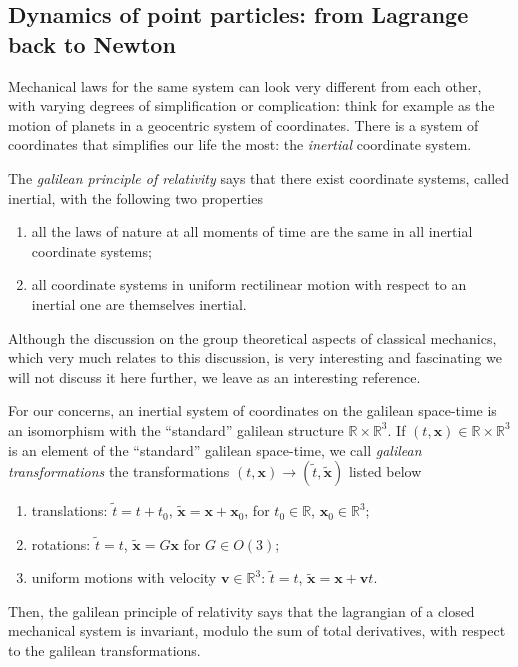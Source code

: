 \documentclass[english,fontsize=11pt,paper=a5,oneside]{scrbook}
\newcommand{\R}{\mathbb{R}}
\newcommand{\bx}{\bm{x}}
\theoremstyle{definition}
\begin{document}
\subsection{Dynamics of point particles: from Lagrange back to Newton}\label{sec:dynamicspps}

Mechanical laws for the same system can look very different from each other, with varying degrees of simplification or complication: think for example as the motion of planets in a geocentric system of coordinates.
There is a system of coordinates that simplifies our life the most: the \emph{inertial} coordinate system.

\begin{tcolorbox}
  The \emph{galilean principle of relativity} says that there exist coordinate systems, called inertial, with the following two properties
  \begin{enumerate}
    \item all the laws of nature at all moments of time are the same in all inertial coordinate systems;
    \item all coordinate systems in uniform rectilinear motion with respect to an inertial one are themselves inertial.
  \end{enumerate}
\end{tcolorbox}

Although the discussion on the group theoretical aspects of classical mechanics, which very much relates to this discussion, is very interesting and fascinating we will not discuss it here further, we leave \cite{book:marsdenratiu} as an interesting reference.

For our concerns, an inertial system of coordinates on the galilean space-time is an isomorphism with the ``standard'' galilean structure $\R\times\R^3$.
If $(t, \bx) \in \R\times \R^3$ is an element of the ``standard'' galilean space-time, we call \emph{galilean transformations} the transformations $(t,\bx) \to (\widetilde t, \widetilde{\bx})$ listed below
\begin{enumerate}
  \item translations: $\widetilde t = t + t_0$, $\widetilde{\bx} = \bx + \bx_0$, for $t_0\in\R$, $\bx_0\in\R^3$;
  \item rotations: $\widetilde t = t$, $\widetilde{\bx} = G\bx$ for $G\in O(3)$;
  \item uniform motions with velocity $\bm{v}\in\R^3$: $\widetilde t = t$, $\widetilde{\bx} = \bx + \bm{v} t$.
\end{enumerate}
Then, the galilean principle of relativity says that the lagrangian of a closed mechanical system is invariant, modulo the sum of total derivatives, with respect to the galilean transformations.
\end{document}
